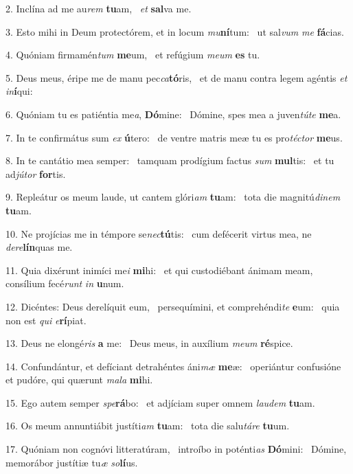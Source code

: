 2. Inclína ad me au\textit{rem} \textbf{tu}am, \ast\  \textit{et} \textbf{sal}va me.\

3. Esto mihi in Deum protectórem, et in locum \textit{mu}\textbf{ní}tum: \ast\  ut sal\textit{vum} \textit{me} \textbf{fá}cias.\

4. Quóniam firmamén\textit{tum} \textbf{me}um, \ast\  et refúgium \textit{me}\textit{um} \textbf{es} tu.\

5. Deus meus, éripe me de manu pec\textit{ca}\textbf{tó}ris, \ast\  et de manu contra legem agéntis \textit{et} \textit{in}\textbf{í}qui:\

6. Quóniam tu es patiéntia me\textit{a}, \textbf{Dó}mine: \ast\  Dómine, spes mea a juven\textit{tú}\textit{te} \textbf{me}a.\

7. In te confirmátus sum \textit{ex} \textbf{ú}tero: \ast\  de ventre matris meæ tu es pro\textit{téc}\textit{tor} \textbf{me}us.\

8. In te cantátio mea semper: \dag\  tamquam prodígium factus \textit{sum} \textbf{mul}tis: \ast\  et tu ad\textit{jú}\textit{tor} \textbf{for}tis.\

9. Repleátur os meum laude, ut cantem glóri\textit{am} \textbf{tu}am: \ast\  tota die magnitú\textit{di}\textit{nem} \textbf{tu}am.\

10. Ne projícias me in témpore se\textit{nec}\textbf{tú}tis: \ast\  cum defécerit virtus mea, ne \textit{de}\textit{re}\textbf{lín}quas me.\

11. Quia dixérunt inimíci me\textit{i} \textbf{mi}hi: \ast\  et qui custodiébant ánimam meam, consílium fecé\textit{runt} \textit{in} \textbf{u}num.\

12. Dicéntes: Deus derelíquit eum, \dag\  persequímini, et comprehéndi\textit{te} \textbf{e}um: \ast\  quia non est \textit{qui} \textit{e}\textbf{rí}piat.\

13. Deus ne elongé\textit{ris} \textbf{a} me: \ast\  Deus meus, in auxílium \textit{me}\textit{um} \textbf{ré}spice.\

14. Confundántur, et defíciant detrahéntes áni\textit{mæ} \textbf{me}æ: \ast\  operiántur confusióne et pudóre, qui quærunt \textit{ma}\textit{la} \textbf{mi}hi.\

15. Ego autem semper \textit{spe}\textbf{rá}bo: \ast\  et adjíciam super omnem \textit{lau}\textit{dem} \textbf{tu}am.\

16. Os meum annuntiábit justíti\textit{am} \textbf{tu}am: \ast\  tota die salu\textit{tá}\textit{re} \textbf{tu}um.\

17. Quóniam non cognóvi litteratúram, \dag\  introíbo in poténti\textit{as} \textbf{Dó}mini: \ast\  Dómine, memorábor justítiæ tu\textit{æ} \textit{so}\textbf{lí}us.\

